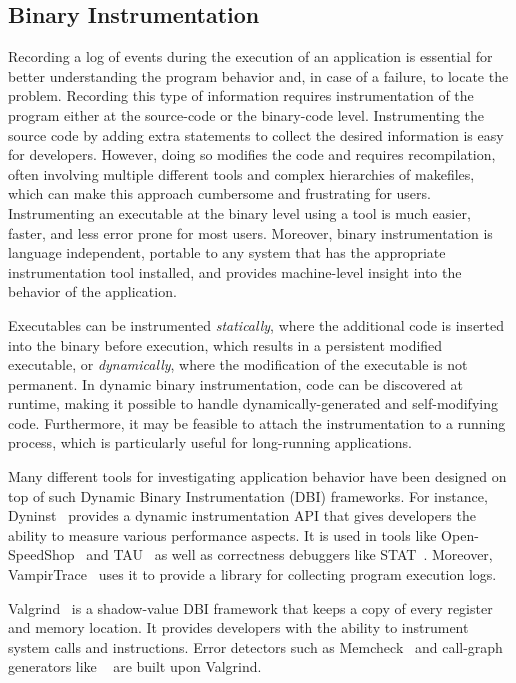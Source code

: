 \subsection{Binary Instrumentation}
Recording a log of events during the execution of an application is essential for better understanding the program behavior and, in case of a failure, to locate the problem. Recording this type of information requires instrumentation of the program either at the source-code or the binary-code level. Instrumenting the source code by adding extra statements to collect the desired information is easy for developers. However, doing so modifies the code and requires recompilation, often involving multiple different tools and complex hierarchies of makefiles, which can make this approach cumbersome and frustrating for users. Instrumenting an executable at the binary level using a tool is much easier, faster, and less error prone for most users. Moreover, binary instrumentation is language independent, portable to any system that has the appropriate instrumentation tool installed, and provides machine-level insight into the behavior of the application.

Executables can be instrumented \textit{statically}, where the additional code is inserted into the binary before execution, which results in a persistent modified executable, or \textit{dynamically}, where the modification of the executable is not permanent. In dynamic binary instrumentation, code can be discovered at runtime, making it possible to handle dynamically-generated and self-modifying code. Furthermore, it may be feasible to attach the instrumentation to a running process, which is particularly useful for long-running applications.

Many different tools for investigating application behavior have been designed on top of such Dynamic Binary Instrumentation (DBI) frameworks. For instance, Dyninst~\cite{dyninst} provides a dynamic instrumentation API that gives developers the ability to measure various performance aspects. It is used in tools like Open-SpeedShop~\cite{openss} and TAU~\cite{tau} as well as correctness debuggers like STAT~\cite{stat}. Moreover, VampirTrace~\cite{vampirt} uses it to provide a library for collecting program execution logs. 

Valgrind~\cite{valgrind} is a shadow-value DBI framework that keeps a copy of every register and memory location. It provides developers with the ability to instrument system calls and instructions. Error detectors such as Memcheck~\cite{memcheck} and call-graph generators like \callgrind~\cite{callgrind} are built upon Valgrind.

